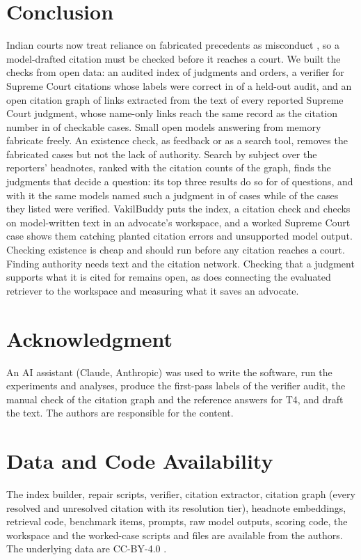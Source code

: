 \documentclass[conference]{IEEEtran}
\begin{document}
\section{Conclusion}
\label{sec:conclusion}
Indian courts now treat reliance on fabricated precedents as misconduct \cite{gummadi}, so a model-drafted citation must be checked before it reaches a court. We built the checks from open data: an audited index of \CorpusTotal{} judgments and orders, a verifier for Supreme Court citations whose labels were correct in \AuditPct{} of a held-out audit, and an open citation graph of \GraphEdges{} links extracted from the text of every reported Supreme Court judgment, whose name-only links reach the same record as the citation number in \GraphNameSamePct{} of checkable cases. Small open models answering from memory fabricate freely. An existence check, as feedback or as a search tool, removes the fabricated cases but not the lack of authority. Search by subject over the reporters' headnotes, ranked with the citation counts of the graph, finds the judgments that decide a question: its top three results do so for \QHybridPriorHitThree{} of \NumTopics{} questions, and with it the same models named such a judgment in \RefAllTopicPrior{} of \RefQuestionsAll{} cases while \VerPctAllTopicPrior{} of the cases they listed were verified. VakilBuddy puts the index, a citation check and checks on model-written text in an advocate's workspace, and a worked Supreme Court case shows them catching planted citation errors and unsupported model output. Checking existence is cheap and should run before any citation reaches a court. Finding authority needs text and the citation network. Checking that a judgment supports what it is cited for remains open, as does connecting the evaluated retriever to the workspace and measuring what it saves an advocate.

\section*{Acknowledgment}
An AI assistant (Claude, Anthropic) was used to write the software, run the experiments and analyses, produce the first-pass labels of the verifier audit, the manual check of the citation graph and the reference answers for T4, and draft the text. The authors are responsible for the content.

\section*{Data and Code Availability}
The index builder, repair scripts, verifier, citation extractor, citation graph (every resolved and unresolved citation with its resolution tier), headnote embeddings, retrieval code, benchmark items, prompts, raw model outputs, scoring code, the workspace and the worked-case scripts and files are available from the authors. The underlying data are CC-BY-4.0 \cite{awssc,awshc}.



\end{document}
